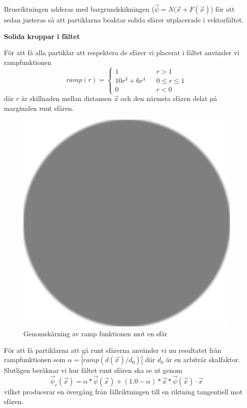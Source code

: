 \documentclass[a4paper]{article}
\begin{document}
\begin{multicols}{2}
Brusriktningen adderas med bargrundskikningen ($\vec{\psi} = N(\vec{x} + F(\vec{x})$) för att sedan justeras så att partiklarna beaktar solida sfärer utplacerade i vektorfältet. 

\textbf{Solida kroppar i fältet}

För att få alla partiklar att respektera de sfärer vi placerat i fältet använder vi rampfunktionen
\begin{equation}
ramp(r) = \left\{\begin{matrix}
1  && r > 1
\\
10r^3 + 6r^4 && 0 \le r \le 1
\\ 
0  && r < 0
\end{matrix}\right.
\end{equation}
där $r$ är skillnaden mellan distansen $\vec{x}$ och den närmsta sfären delat på marginalen runt sfären. 
\begin{figure}[H]
\center
\begin{minipage}[]{0.3\textwidth}
\includegraphics[width=\textwidth]{share/Alpha.png}
\caption{Genomskärning av ramp funktionen mot en sfär}
\end{minipage}
\end{figure}

För att få partiklarna att gå runt sfärerna använder vi nu resultatet från rampfunktionen som $\alpha = | ramp(d(\vec{x})/d_0) |$ där $d_0$  är en arbiträr skalfaktor. Slutligen beräknar vi hur fältet runt sfären ska se ut genom 
\begin{equation}
\vec{\psi}_c(\vec{x}) = \alpha * \vec{\psi}(\vec{x}) + (1.0 - \alpha) * \vec{x} * \vec{\psi}(\vec{x}) \cdot \vec{x}
\end{equation}
vilket producerar en övergång från fällriktningen till en riktning tangentiell mot sfären.


\end{multicols}
\end{document}
